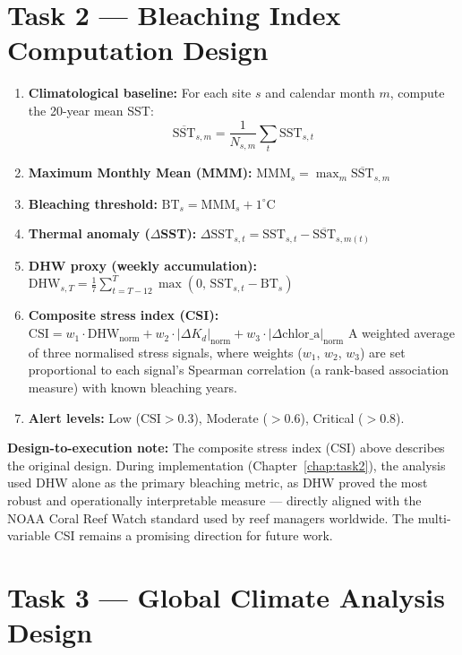 \documentclass[12pt,a4paper]{report}
\begin{document}
\section{Task 2 — Bleaching Index Computation Design}

\begin{enumerate}[leftmargin=*]
  \item \textbf{Climatological baseline:} For each site $s$ and calendar month $m$,
    compute the 20-year mean SST:
    \[
      \overline{\text{SST}}_{s,m} = \frac{1}{N_{s,m}} \sum_{t} \text{SST}_{s,t}
    \]
  \item \textbf{Maximum Monthly Mean (MMM):}
    $\text{MMM}_s = \max_m \overline{\text{SST}}_{s,m}$
  \item \textbf{Bleaching threshold:} $\text{BT}_s = \text{MMM}_s + 1^\circ\text{C}$
  \item \textbf{Thermal anomaly ($\Delta$SST):}
    $\Delta\text{SST}_{s,t} = \text{SST}_{s,t} - \overline{\text{SST}}_{s,m(t)}$
  \item \textbf{DHW proxy (weekly accumulation):}
    $\text{DHW}_{s,T} = \frac{1}{7} \sum_{t=T-12}^{T}
      \max(0,\, \text{SST}_{s,t} - \text{BT}_s)$
  \item \textbf{Composite stress index (CSI):}
    $\text{CSI} = w_1 \cdot \text{DHW}_{\text{norm}} + w_2 \cdot |\Delta K_d|_{\text{norm}}
      + w_3 \cdot |\Delta\text{chlor\_a}|_{\text{norm}}$
    A weighted average of three normalised stress signals, where weights ($w_1$, $w_2$,
    $w_3$) are set proportional to each signal's Spearman correlation
    (a rank-based association measure) with known bleaching years.
  \item \textbf{Alert levels:} Low ($\text{CSI} > 0.3$), Moderate ($> 0.6$),
    Critical ($> 0.8$).
\end{enumerate}

\begin{challengebox}
\textbf{Design-to-execution note:} The composite stress index (CSI) above describes the
original design. During implementation (Chapter~\ref{chap:task2}), the analysis used
DHW alone as the primary bleaching metric, as DHW proved the most robust and
operationally interpretable measure — directly aligned with the NOAA Coral Reef Watch
standard used by reef managers worldwide. The multi-variable CSI remains a promising
direction for future work.
\end{challengebox}

\section{Task 3 — Global Climate Analysis Design}
\end{document}
